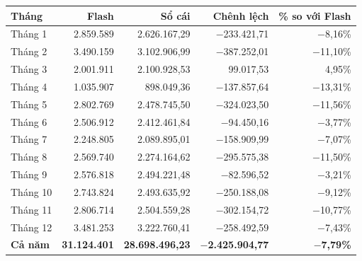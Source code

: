 \begin{tabular}{@{}l r r r r@{}}
\toprule
Tháng & Flash & Sổ cái & Chênh lệch & \% so với Flash \\
\midrule
Tháng 1 & 2.859.589 & 2.626.167,29 & $-$233.421,71 & $-$8,16\% \\
Tháng 2 & 3.490.159 & 3.102.906,99 & $-$387.252,01 & $-$11,10\% \\
Tháng 3 & 2.001.911 & 2.100.928,53 & 99.017,53 & 4,95\% \\
Tháng 4 & 1.035.907 & 898.049,36 & $-$137.857,64 & $-$13,31\% \\
Tháng 5 & 2.802.769 & 2.478.745,50 & $-$324.023,50 & $-$11,56\% \\
Tháng 6 & 2.506.912 & 2.412.461,84 & $-$94.450,16 & $-$3,77\% \\
Tháng 7 & 2.248.805 & 2.089.895,01 & $-$158.909,99 & $-$7,07\% \\
Tháng 8 & 2.569.740 & 2.274.164,62 & $-$295.575,38 & $-$11,50\% \\
Tháng 9 & 2.576.818 & 2.494.221,48 & $-$82.596,52 & $-$3,21\% \\
Tháng 10 & 2.743.824 & 2.493.635,92 & $-$250.188,08 & $-$9,12\% \\
Tháng 11 & 2.806.714 & 2.504.559,28 & $-$302.154,72 & $-$10,77\% \\
Tháng 12 & 3.481.253 & 3.222.760,41 & $-$258.492,59 & $-$7,43\% \\
\midrule
\textbf{Cả năm} & \textbf{31.124.401} & \textbf{28.698.496,23} & \textbf{$-$2.425.904,77} & \textbf{$-$7,79\%} \\
\bottomrule
\end{tabular}
